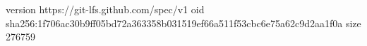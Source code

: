 version https://git-lfs.github.com/spec/v1
oid sha256:1f706ac30b9ff05bd72a363358b031519ef66a511f53cbc6e75a62c9d2aa1f0a
size 276759
